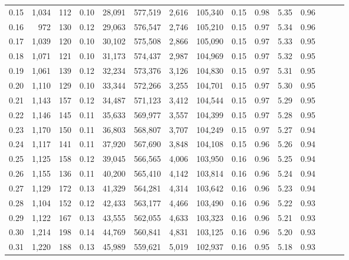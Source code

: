 \begin{tabular}{rrrrrrrrrrrrrrr}
0.15 &   1,034 &    112 &  0.10 &   28,091 &  577,519 &    2,616 &  105,340 &  0.15 &  0.98 &  5.35 &      0.96 \\
0.16 &     972 &    130 &  0.12 &   29,063 &  576,547 &    2,746 &  105,210 &  0.15 &  0.97 &  5.34 &      0.96 \\
0.17 &   1,039 &    120 &  0.10 &   30,102 &  575,508 &    2,866 &  105,090 &  0.15 &  0.97 &  5.33 &      0.95 \\
0.18 &   1,071 &    121 &  0.10 &   31,173 &  574,437 &    2,987 &  104,969 &  0.15 &  0.97 &  5.32 &      0.95 \\
0.19 &   1,061 &    139 &  0.12 &   32,234 &  573,376 &    3,126 &  104,830 &  0.15 &  0.97 &  5.31 &      0.95 \\
0.20 &   1,110 &    129 &  0.10 &   33,344 &  572,266 &    3,255 &  104,701 &  0.15 &  0.97 &  5.30 &      0.95 \\
0.21 &   1,143 &    157 &  0.12 &   34,487 &  571,123 &    3,412 &  104,544 &  0.15 &  0.97 &  5.29 &      0.95 \\
0.22 &   1,146 &    145 &  0.11 &   35,633 &  569,977 &    3,557 &  104,399 &  0.15 &  0.97 &  5.28 &      0.95 \\
0.23 &   1,170 &    150 &  0.11 &   36,803 &  568,807 &    3,707 &  104,249 &  0.15 &  0.97 &  5.27 &      0.94 \\
0.24 &   1,117 &    141 &  0.11 &   37,920 &  567,690 &    3,848 &  104,108 &  0.15 &  0.96 &  5.26 &      0.94 \\
0.25 &   1,125 &    158 &  0.12 &   39,045 &  566,565 &    4,006 &  103,950 &  0.16 &  0.96 &  5.25 &      0.94 \\
0.26 &   1,155 &    136 &  0.11 &   40,200 &  565,410 &    4,142 &  103,814 &  0.16 &  0.96 &  5.24 &      0.94 \\
0.27 &   1,129 &    172 &  0.13 &   41,329 &  564,281 &    4,314 &  103,642 &  0.16 &  0.96 &  5.23 &      0.94 \\
0.28 &   1,104 &    152 &  0.12 &   42,433 &  563,177 &    4,466 &  103,490 &  0.16 &  0.96 &  5.22 &      0.93 \\
0.29 &   1,122 &    167 &  0.13 &   43,555 &  562,055 &    4,633 &  103,323 &  0.16 &  0.96 &  5.21 &      0.93 \\
0.30 &   1,214 &    198 &  0.14 &   44,769 &  560,841 &    4,831 &  103,125 &  0.16 &  0.96 &  5.20 &      0.93 \\
0.31 &   1,220 &    188 &  0.13 &   45,989 &  559,621 &    5,019 &  102,937 &  0.16 &  0.95 &  5.18 &      0.93 \\

\end{tabular}
